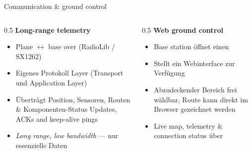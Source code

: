 \begin{frame}{Communication \& ground control}
  \begin{columns}[T,onlytextwidth]
    \begin{column}{0.5\textwidth}
      \textbf{\faBroadcastTower\; Long-range telemetry}
      \begin{itemize}
        \item Plane $\leftrightarrow$ base over  (RadioLib / SX1262)
        \item Eigenes Protokoll Layer (Transport und Application Layer)
        \item Überträgt Position, Sensoren, Routen \& Komponenten-Status
              Updates, ACKs and keep-alive pings
        \item \emph{Long range, low bandwidth} — nur essenzielle Daten
      \end{itemize}
    \end{column}
    \begin{column}{0.5\textwidth}
      \textbf{\faGlobe\; Web ground control}
      \begin{itemize}
        \item Base station öffnet einen 
        \item Stellt ein Webinterface zur Verfügung 
        \item Abzudeckender Bereich frei wählbar, Route kann direkt im Browser gezeichnet werden
        \item Live map, telemetry \& connection status über
      \end{itemize}

      \vspace{0.4em}
       
       
    \end{column}
  \end{columns}
\end{frame}
